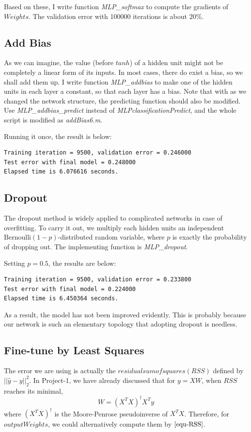 \documentclass{article}
\begin{document}
Based on these, I write function \emph{MLP\_softmax} to compute the gradients of $Weights$. The validation error with 100000 iterations is about $20\%$.

\subsection{Add Bias}
As we can imagine, the value (before $tanh$) of a hidden unit might not be completely a linear form of its inputs. In most cases, there do exist a bias, so we shall add them up. I write function \emph{MLP\_addbias} to make one of the hidden units in each layer a constant, so that each layer has a bias. Note that with as we changed the network structure, the predicting function should also be modified. Use \emph{MLP\_addbias\_predict} instead of \emph{MLPclassificationPredict}, and the whole script is modified as \emph{addBias6.m}.

Running it once, the result is below:
\begin{verbatim}
Training iteration = 9500, validation error = 0.246000
Test error with final model = 0.248000
Elapsed time is 6.076616 seconds.
\end{verbatim}

\subsection{Dropout}
The dropout method is widely applied to complicated networks in case of overfitting. To carry it out, we multiply each hidden units an independent $\mathrm{Bernoulli}(1-p)$-distributed random variable, where $p$ is exactly the probability of dropping out. The implementing function is \emph{MLP\_dropout}.

Setting $p=0.5$, the results are below:
\begin{verbatim}
Training iteration = 9500, validation error = 0.233800
Test error with final model = 0.224000
Elapsed time is 6.450364 seconds.
\end{verbatim}

As a result, the model has not been improved evidently. This is probably because our network is such an elementary topology that adopting dropout is needless.

\subsection{Fine-tune by Least Squares}
The error we are using is actually the $residual sum of squares (RSS)$ defined by $||\hat{y} - y||_2^2$. In Project-1, we have already discussed that for $y = XW$, when $RSS$ reaches its minimal,
\begin{equation}
W = \left( X^T X \right)^\dagger X^T y \tag{$\ast$} \label{equ-RSS}
\end{equation}
where $\left( X^T X \right)^\dagger$ is the Moore-Penrose pseudoinverse of $X^T X$.
Therefore, for $outputWeights$, we could alternatively compute them by $\eqref{equ-RSS}$.
\end{document}
